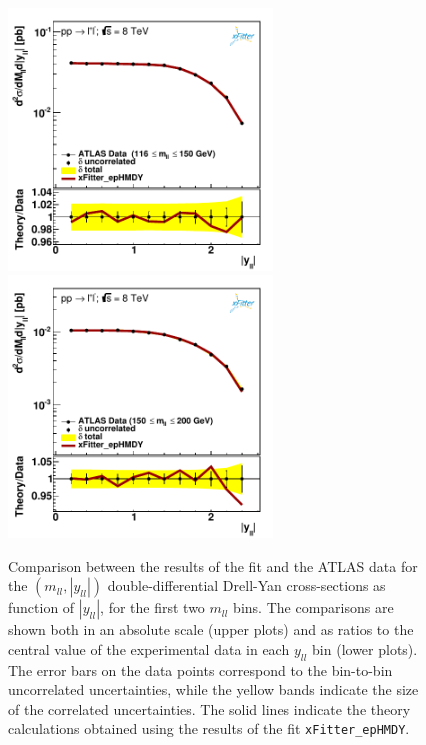 \begin{figure}[t]
\centering
\includegraphics[width=7cm]{figs/data_401-1.pdf}
\includegraphics[width=7cm]{figs/data_402-1.pdf}
\caption{Comparison between the results of the fit and the ATLAS data
  for the $(m_{ll},|y_{ll}|)$ double-differential Drell-Yan cross-sections
  as function of $|y_{ll}|$, for the first two $m_{ll}$ bins.
  The comparisons are shown both
  in an absolute scale (upper plots) and as ratios to the central value
  of the experimental data in each $y_{ll}$ bin (lower plots).
  The error bars on the data points correspond to the bin-to-bin uncorrelated
  uncertainties, while the yellow bands
  indicate the size of the correlated uncertainties.
  The solid lines indicate the theory calculations obtained using the results
  of the fit {\tt xFitter\_epHMDY}.
}
\label{hmDY_2D_1}
\end{figure}

